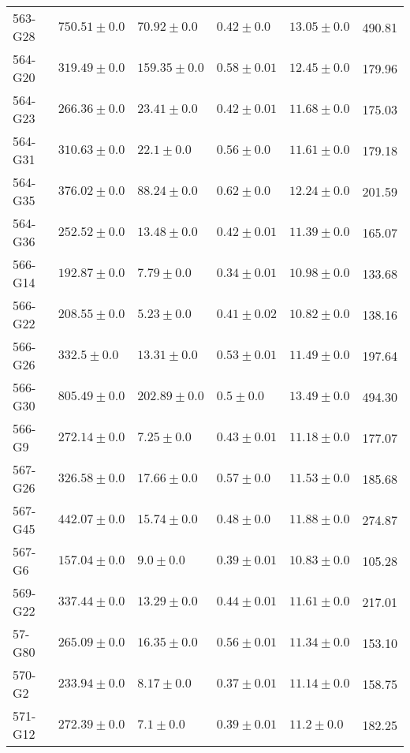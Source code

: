 \begin{tabular}{lllllr}
    563-G28 &     $750.51 \pm 0.0$ &       $70.92 \pm 0.0$ &   $0.42 \pm 0.0$ &  $13.05 \pm 0.0$ &    490.81 \\
    564-G20 &     $319.49 \pm 0.0$ &      $159.35 \pm 0.0$ &  $0.58 \pm 0.01$ &  $12.45 \pm 0.0$ &    179.96 \\
    564-G23 &     $266.36 \pm 0.0$ &       $23.41 \pm 0.0$ &  $0.42 \pm 0.01$ &  $11.68 \pm 0.0$ &    175.03 \\
    564-G31 &     $310.63 \pm 0.0$ &        $22.1 \pm 0.0$ &   $0.56 \pm 0.0$ &  $11.61 \pm 0.0$ &    179.18 \\
    564-G35 &     $376.02 \pm 0.0$ &       $88.24 \pm 0.0$ &   $0.62 \pm 0.0$ &  $12.24 \pm 0.0$ &    201.59 \\
    564-G36 &     $252.52 \pm 0.0$ &       $13.48 \pm 0.0$ &  $0.42 \pm 0.01$ &  $11.39 \pm 0.0$ &    165.07 \\
    566-G14 &     $192.87 \pm 0.0$ &        $7.79 \pm 0.0$ &  $0.34 \pm 0.01$ &  $10.98 \pm 0.0$ &    133.68 \\
    566-G22 &     $208.55 \pm 0.0$ &        $5.23 \pm 0.0$ &  $0.41 \pm 0.02$ &  $10.82 \pm 0.0$ &    138.16 \\
    566-G26 &      $332.5 \pm 0.0$ &       $13.31 \pm 0.0$ &  $0.53 \pm 0.01$ &  $11.49 \pm 0.0$ &    197.64 \\
    566-G30 &     $805.49 \pm 0.0$ &      $202.89 \pm 0.0$ &    $0.5 \pm 0.0$ &  $13.49 \pm 0.0$ &    494.30 \\
     566-G9 &     $272.14 \pm 0.0$ &        $7.25 \pm 0.0$ &  $0.43 \pm 0.01$ &  $11.18 \pm 0.0$ &    177.07 \\
    567-G26 &     $326.58 \pm 0.0$ &       $17.66 \pm 0.0$ &   $0.57 \pm 0.0$ &  $11.53 \pm 0.0$ &    185.68 \\
    567-G45 &     $442.07 \pm 0.0$ &       $15.74 \pm 0.0$ &   $0.48 \pm 0.0$ &  $11.88 \pm 0.0$ &    274.87 \\
     567-G6 &     $157.04 \pm 0.0$ &         $9.0 \pm 0.0$ &  $0.39 \pm 0.01$ &  $10.83 \pm 0.0$ &    105.28 \\
    569-G22 &     $337.44 \pm 0.0$ &       $13.29 \pm 0.0$ &  $0.44 \pm 0.01$ &  $11.61 \pm 0.0$ &    217.01 \\
     57-G80 &     $265.09 \pm 0.0$ &       $16.35 \pm 0.0$ &  $0.56 \pm 0.01$ &  $11.34 \pm 0.0$ &    153.10 \\
     570-G2 &     $233.94 \pm 0.0$ &        $8.17 \pm 0.0$ &  $0.37 \pm 0.01$ &  $11.14 \pm 0.0$ &    158.75 \\
    571-G12 &     $272.39 \pm 0.0$ &         $7.1 \pm 0.0$ &  $0.39 \pm 0.01$ &   $11.2 \pm 0.0$ &    182.25 \\

\end{tabular}

